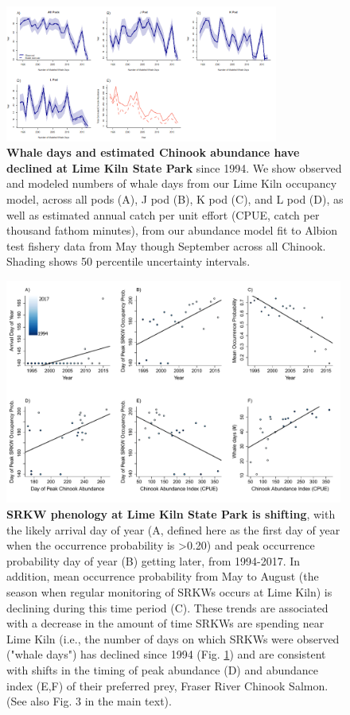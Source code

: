 \documentclass{article}
\begin{document}
\begin{figure}[!hp]
\includegraphics[width=0.8\textwidth]{../analyses/orcaphen/figures/modwhaledays_lime.png} 
\caption{\textbf{Whale days and estimated Chinook abundance have declined at Lime Kiln State Park} since 1994. We show observed and modeled numbers of whale days from our Lime Kiln occupancy model, across all pods (A), J pod (B), K pod (C), and L pod (D), as well as estimated annual catch per unit effort (CPUE, catch per thousand fathom minutes), from our abundance model fit to Albion test fishery data from May though September across all Chinook. Shading shows 50 percentile uncertainty intervals.}
\label{fig:mlimewdays}
\end{figure}
\begin{figure}[!hp]
\includegraphics[width=0.99\textwidth]{../analyses/orcaphen/figures/phentrends_lime_peak.pdf} 
\caption{\textbf{SRKW phenology at Lime Kiln State Park is shifting}, with the likely arrival day of year (A, defined here as the first day of year when the occurrence probability is >0.20) and peak occurrence probability day of year (B) getting later, from 1994-2017. In addition, mean occurrence probability from May to August (the season when regular monitoring of SRKWs occurs at Lime Kiln) is declining during this time period (C). These trends are associated with a decrease in the amount of time SRKWs are spending near Lime Kiln (i.e., the number of days on which SRKWs were observed ("whale days") has declined since 1994 (Fig. \ref{fig:mlimewdays}) and are consistent with shifts in the timing of peak abundance (D) and abundance index (E,F) of their preferred prey, Fraser River Chinook Salmon. (See also Fig. 3 in the main text).}
\label{fig:limetime}
\end{figure}
\end{document}
